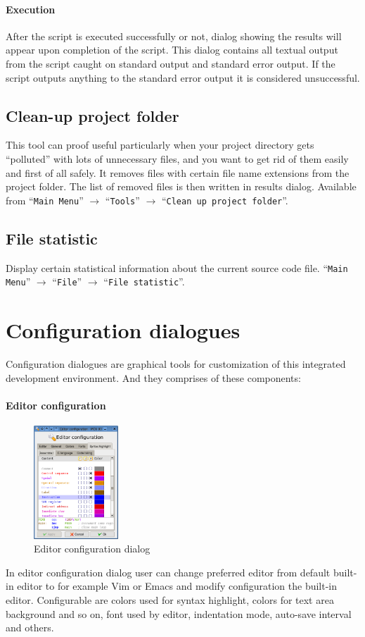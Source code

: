 \documentclass[a4paper,twoside,12pt]{book}
\newcommand{\menuitem}[1]{\texttt{#1}}
\begin{document}
			\paragraph{Execution}
				After the script is executed successfully or not, dialog showing the results will appear upon completion of the script. This dialog contains all textual output from the script caught on standard output and standard error output. If the script outputs anything to the standard error output it is considered unsuccessful.

		\subsection{Clean-up project folder}
			This tool can proof useful particularly when your project directory gets ``polluted'' with lots of unnecessary files, and you want to get rid of them easily and first of all safely. It removes files with certain file name extensions from the project folder. The list of removed files is then written in results dialog. Available from ``\menuitem{Main Menu}'' $\rightarrow$ ``\menuitem{Tools}'' $\rightarrow$ ``\menuitem{Clean up project folder}''.

		\subsection{File statistic}
			Display certain statistical information about the current source code file. ``\menuitem{Main Menu}'' $\rightarrow$ ``\menuitem{File}'' $\rightarrow$ ``\menuitem{File statistic}''.

	\section{Configuration dialogues}
		Configuration dialogues are graphical tools for customization of this integrated development environment. And they comprises of these components:

		\paragraph{Editor configuration}
			\begin{figure}
				\centering{}
				\includegraphics[width=90pt]{img/027.png}
				\caption{Editor configuration dialog}
			\end{figure}
			In editor configuration dialog user can change preferred editor from default built-in editor to for example Vim or Emacs and modify configuration the built-in editor. Configurable are colors used for syntax highlight, colors for text area background and so on, font used by editor, indentation mode, auto-save interval and others.
\end{document}

